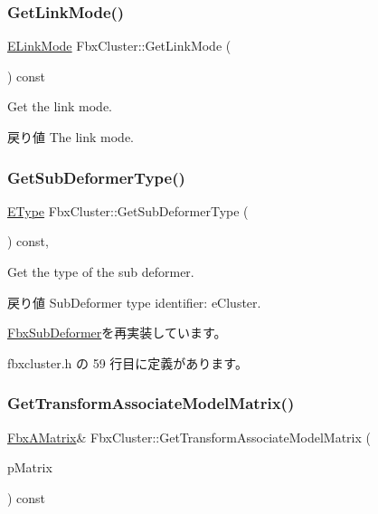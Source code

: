 \subsubsection{\texorpdfstring{Get\+Link\+Mode()}{GetLinkMode()}}
{\footnotesize\ttfamily \hyperlink{class_fbx_cluster_aaa2afaedfd33eda65c46bb5a3d04dab0}{E\+Link\+Mode} Fbx\+Cluster\+::\+Get\+Link\+Mode (\begin{DoxyParamCaption}{ }\end{DoxyParamCaption}) const}

Get the link mode. \begin{DoxyReturn}{戻り値}
The link mode. 
\end{DoxyReturn}
\mbox{\label{class_fbx_cluster_aa395931c54c7a8b7e23b1be50b32a1d6}} 
\subsubsection{\texorpdfstring{Get\+Sub\+Deformer\+Type()}{GetSubDeformerType()}}
{\footnotesize\ttfamily \hyperlink{class_fbx_sub_deformer_aed7eba8aabbb8b25a8ddbab127d67319}{E\+Type} Fbx\+Cluster\+::\+Get\+Sub\+Deformer\+Type (\begin{DoxyParamCaption}{ }\end{DoxyParamCaption}) const\hspace{0.3cm}{\ttfamily [inline]}, {\ttfamily [virtual]}}

Get the type of the sub deformer. \begin{DoxyReturn}{戻り値}
Sub\+Deformer type identifier\+: e\+Cluster. 
\end{DoxyReturn}


\hyperlink{class_fbx_sub_deformer_a1a1998b98ca03598bc6bec630e1aaa97}{Fbx\+Sub\+Deformer}を再実装しています。



 fbxcluster.\+h の 59 行目に定義があります。

\mbox{\label{class_fbx_cluster_a47228a06a38257e983f42a349a2d3fb0}} 
\subsubsection{\texorpdfstring{Get\+Transform\+Associate\+Model\+Matrix()}{GetTransformAssociateModelMatrix()}}
{\footnotesize\ttfamily \hyperlink{class_fbx_a_matrix}{Fbx\+A\+Matrix}\& Fbx\+Cluster\+::\+Get\+Transform\+Associate\+Model\+Matrix (\begin{DoxyParamCaption}\item[{\hyperlink{class_fbx_a_matrix}{Fbx\+A\+Matrix} \&}]{p\+Matrix }\end{DoxyParamCaption}) const}

